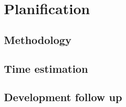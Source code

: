 \chapter{Planification}

\section{Methodology}


\section{Time estimation}

\section{Development follow up}
